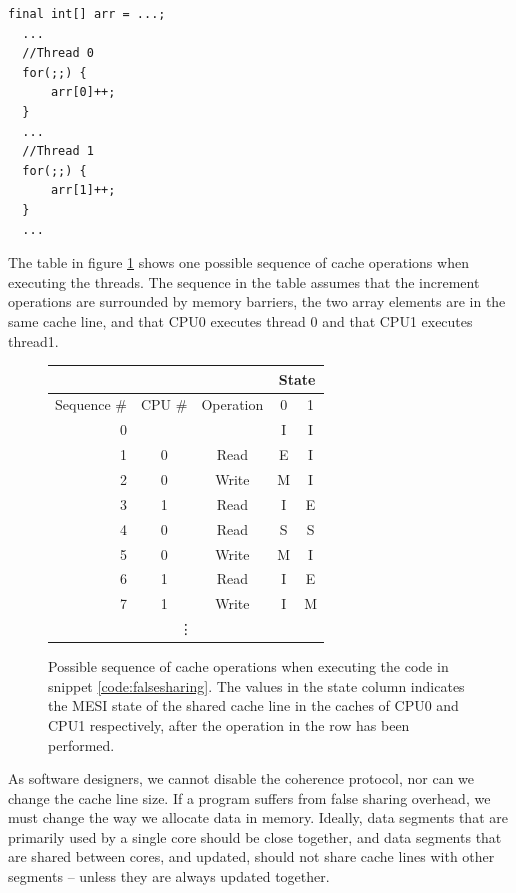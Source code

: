 \begin{code}
\begin{Verbatim}[frame=single]
  final int[] arr = ...;
  ...
  //Thread 0
  for(;;) {
	  arr[0]++;
  }
  ...
  //Thread 1
  for(;;) {
	  arr[1]++;
  }
  ...
\end{Verbatim}
	\caption{Pseudo showing two threads accessing different sets of data,
	that may be located in the same cache line.}
	\label{code:falsesharing}
\end{code}

The table in figure \ref{table:invalidationsequence} shows one possible sequence
of cache operations when executing the threads. The sequence in the table
assumes that the increment operations are surrounded by memory barriers, the two
array elements are in the same cache line, and that CPU0 executes thread 0 and
that CPU1 executes thread1.

\begin{figure}[hbtp]
	\centering
	\begin{tabular}{r|c|c|c|c}
	& & & \multicolumn{2}{c}{State} \\
	\hline
	Sequence \# & CPU \# & Operation & 0 & 1\\
	\hline
	\hline
	0 & & & I & I\\
	\hline
	1 & 0 & Read & E & I\\
	\hline
	2 & 0 & Write & M & I\\
	\hline
	3 & 1 & Read & I & E\\
	\hline
	4 & 0 & Read & S & S\\
	\hline
	5 & 0 & Write & M & I\\
	\hline
	6 & 1 & Read & I & E\\
	\hline
	7 & 1 & Write & I & M\\
	\hline
		\multicolumn{5}{c}{\vdots}
\end{tabular}
	\caption{Possible sequence of cache operations when executing the code
	in snippet \ref{code:falsesharing}. The values in the state column
	indicates the MESI state of the shared cache line in the caches of CPU0
	and CPU1 respectively, after the operation in the row has been performed.}
	\label{table:invalidationsequence}
\end{figure}

As software designers, we cannot disable the coherence protocol, nor can we
change the cache line size. If a program suffers from false sharing overhead, we
must change the way we allocate data in memory. Ideally, data segments that are
primarily used by a single core should be close together, and data segments that
are shared between cores, and updated, should not share cache lines with other segments
-- unless they are always updated together.

